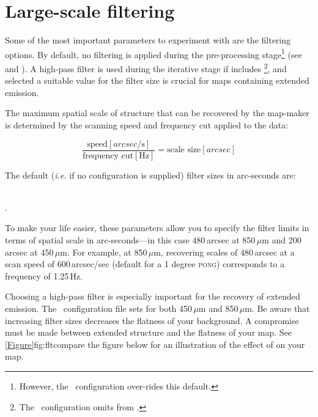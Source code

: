 \section{Large-scale filtering}
\label{sec:filt}

Some of the most important parameters to experiment with are the
filtering options. By default, no filtering is applied during the
pre-processing stage\footnote{However, the \blankfield\ configuration
over-rides this default.} (see 
and ). A high-pass
filter is used during the iterative stage if 
includes \footnote{The \blankfield\ configuration omits
 from .}, and selected a suitable value
for the filter size is crucial for maps containing extended emission.

The maximum spatial scale of structure that can be recovered by the
map-maker is determined by the scanning speed and frequency cut
applied to the data:

\begin{equation}
\frac{\textrm{speed}[arcsec / \textrm{s}]}{\textrm{frequency
    cut}[\textrm{Hz}]}=\textrm{scale size}[arcsec]
\end{equation}

The default (\emph{i.e.} if no configuration is supplied) filter sizes
in arc-seconds are:

 \\
.

To make your life easier, these parameters allow you to specify the
filter limits in terms of spatial scale in arc-seconds---in this case
480\,arcsec at 850\,$\mu$m and 200\,arcsec at 450\,$\mu$m. For example,
at 850\,$\mu$m, recovering scales of 480\,arcsec at a scan speed of
600\,arcsec/sec (default for a 1 degree \textsc{pong}) corresponds to
a frequency of 1.25\,Hz.

Choosing a high-pass filter is especially important for the recovery
of extended emission. The \brightextended\ configuration file sets
for both 450\,$\mu$m and 850\,$\mu$m. Be aware that increasing filter sizes
decreases the flatness of your background. A compromise must be made between
extended structure and the flatness of your map. See \cref{Figure}{fig:fltcompare}
{the figure below} for an illustration of the effect of
 on your map.

